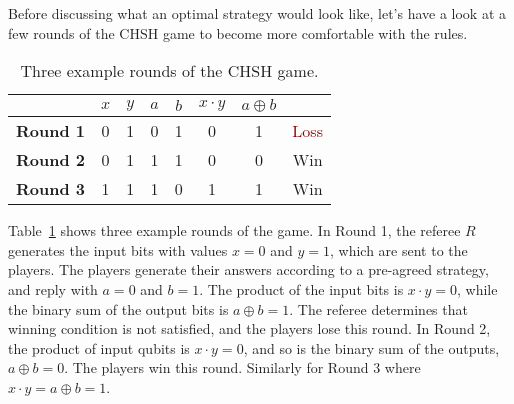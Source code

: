 Before discussing what an optimal strategy would look like, let's have a look at a few rounds of the CHSH game to become more comfortable with the rules.
\begin{table}[h]
    \setcellgapes{5pt}
    \renewcommand\theadfont{}
    \makegapedcells
    \centering
    \begin{tabular}{cccccccc}
        \hline
        & $x$ & $y$ & $a$ & $b$ & $x\cdot y$ & $a\oplus b$ \\
        \hline
        \textbf{Round 1} & 0 & 1 & 0 & 1 & 0 & 1 & \textcolor{darkred}{Loss} \\
        \textbf{Round 2} & 0 & 1 & 1 & 1 & 0 & 0 & \textcolor{newgreen}{Win} \\
        \textbf{Round 3} & 1 & 1 & 1 & 0 & 1 & 1 & \textcolor{newgreen}{Win} \\
        \hline
    \end{tabular}
    \caption[CHSH game example.]{Three example rounds of the CHSH game.}
    \label{tab:4-1_chsh_rounds}
\end{table}
Table~\ref{tab:4-1_chsh_rounds} shows three example rounds of the game.
In Round 1, the referee $R$ generates the input bits with values $x=0$ and $y=1$, which are sent to the players.
The players generate their answers according to a pre-agreed strategy, and reply with $a=0$ and $b=1$.
The product of the input bits is $x\cdot y=0$, while the binary sum of the output bits is $a\oplus b=1$.
The referee determines that winning condition is not satisfied, and the players lose this round.
In Round 2, the product of input qubits is $x\cdot y=0$, and so is the binary sum of the outputs, $a\oplus b=0$. The players win this round.
Similarly for Round 3 where $x\cdot y=a\oplus b=1$.

